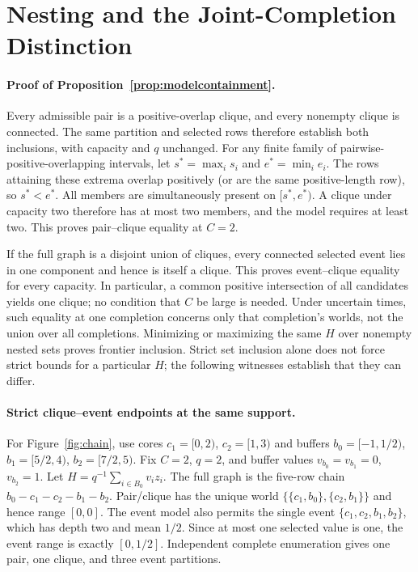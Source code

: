\section{Nesting and the Joint-Completion Distinction}

\paragraph{Proof of Proposition~\ref{prop:modelcontainment}.}
Every admissible pair is a positive-overlap clique, and every nonempty clique
is connected. The same partition and selected rows therefore establish both
inclusions, with capacity and $q$ unchanged. For any finite family of
pairwise-positive-overlapping intervals, let $s^*=\max_i s_i$ and
$e^*=\min_i e_i$. The rows attaining these extrema overlap positively
(or are the same positive-length row), so $s^*<e^*$.
All members are simultaneously present on $[s^*,e^*)$. A clique under
capacity two therefore has at most two members, and the model requires at
least two. This proves pair--clique equality at $C=2$.

If the full graph is a disjoint union of cliques, every connected selected
event lies in one component and hence is itself a clique. This proves
event--clique equality for every capacity. In particular, a common positive
intersection of all candidates yields one clique; no condition that $C$ be
large is needed. Under uncertain times, such equality at one completion
concerns only that completion's worlds, not the union over all completions.
Minimizing or maximizing the same $H$ over nonempty nested sets proves
frontier inclusion. Strict set inclusion alone does not force strict bounds
for a particular $H$; the following witnesses establish that they can differ.

\paragraph{Strict clique--event endpoints at the same support.}
For Figure~\ref{fig:chain}, use cores $c_1=[0,2)$, $c_2=[1,3)$ and buffers
$b_0=[-1,1/2)$, $b_1=[5/2,4)$, $b_2=[7/2,5)$.
Fix $C=2$, $q=2$, and buffer values $v_{b_0}=v_{b_1}=0$, $v_{b_2}=1$.
Let $H=q^{-1}\sum_{i\in B_0}v_i z_i$. The full graph is the five-row chain
$b_0-c_1-c_2-b_1-b_2$. Pair/clique has the unique world
$\{\{c_1,b_0\},\{c_2,b_1\}\}$ and hence range $[0,0]$.
The event model also permits the single event $\{c_1,c_2,b_1,b_2\}$,
which has depth two and mean $1/2$. Since at most one selected value is one,
the event range is exactly $[0,1/2]$. Independent complete enumeration gives
one pair, one clique, and three event partitions.

